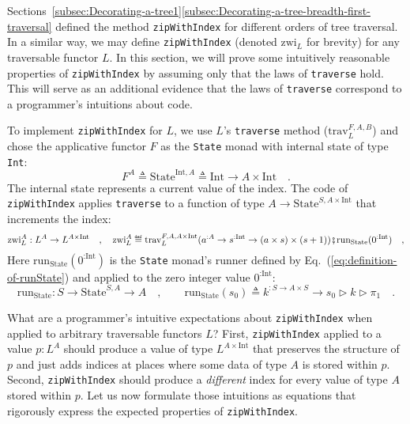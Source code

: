 Sections~\ref{subsec:Decorating-a-tree1}\textendash \ref{subsec:Decorating-a-tree-breadth-first-traversal}
defined the method \lstinline!zipWithIndex! for different orders
of tree traversal. In a similar way, we may define \lstinline!zipWithIndex!
(denoted $\text{zwi}_{L}$ for brevity) for any traversable functor
$L$. In this section, we will prove some intuitively reasonable properties
of \lstinline!zipWithIndex! by assuming only that the laws of \lstinline!traverse!
hold. This will serve as an additional evidence that the laws of \lstinline!traverse!
correspond to a programmer\textsf{'}s intuitions about code.

To implement \lstinline!zipWithIndex! for $L$, we use $L$\textsf{'}s \lstinline!traverse!
method ($\text{trav}_{L}^{F,A,B}$) and chose the applicative functor
$F$ as the \lstinline!State! monad with internal state of type \lstinline!Int!:
\[
F^{A}\triangleq\text{State}^{\text{Int},A}\triangleq\text{Int}\rightarrow A\times\text{Int}\quad.
\]
The internal state represents a current value of the index. The code
of \lstinline!zipWithIndex! applies \lstinline!traverse! to a function
of type $A\rightarrow\text{State}^{S,A\times\text{Int}}$ that increments
the index:
\begin{equation}
\text{zwi}_{L}^{A}:L^{A}\rightarrow L^{A\times\text{Int}}\quad,\quad\text{zwi}_{L}^{A}\triangleq\text{trav}_{L}^{F,A,A\times\text{Int}}(a^{:A}\rightarrow s^{:\text{Int}}\rightarrow(a\times s)\times(s+1))\bef\text{run}_{\text{State}}(0^{:\text{Int}})\quad,\label{eq:definition-of-zwi}
\end{equation}
Here $\text{run}_{\text{State}}(0^{:\text{Int}})$ is the \lstinline!State!
monad\textsf{'}s runner defined by Eq.~(\ref{eq:definition-of-runState})
and applied to the zero integer value $0^{:\text{Int}}$:
\[
\text{run}_{\text{State}}:S\rightarrow\text{State}^{S,A}\rightarrow A\quad,\quad\quad\text{run}_{\text{State}}(s_{0})\triangleq k^{:S\rightarrow A\times S}\rightarrow s_{0}\triangleright k\triangleright\pi_{1}\quad.
\]

What are a programmer\textsf{'}s intuitive expectations about \lstinline!zipWithIndex!
when applied to arbitrary traversable functors $L$? First, \lstinline!zipWithIndex!
applied to a value $p:L^{A}$ should produce a value of type $L^{A\times\text{Int}}$
that preserves the structure of $p$ and just adds indices at places
where some data of type $A$ is stored within $p$. Second, \lstinline!zipWithIndex!
should produce a \emph{different} index for every value of type $A$
stored within $p$. Let us now formulate those intuitions as equations
that rigorously express the expected properties of \lstinline!zipWithIndex!.

